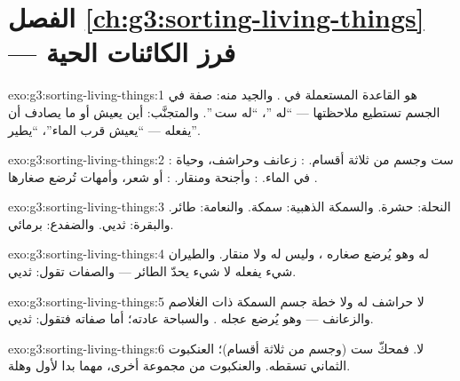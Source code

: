 \section*{الفصل \ref{ch:g3:sorting-living-things} --- فرز الكائنات الحية}

\begin{solution}{exo:g3:sorting-living-things:1}
 هو القاعدة المستعملة في . والجيد منه: صفة في الجسم
تستطيع ملاحظتها --- ``له ''، ``له ست ''. والمتجنَّب: أين
يعيش أو ما يصادف أن يفعله --- ``يعيش قرب الماء''، ``يطير''.
\end{solution}

\begin{solution}{exo:g3:sorting-living-things:2}
: ست  وجسم من ثلاثة أقسام. : زعانف وحراشف،
وحياة في الماء. :  وأجنحة ومنقار. :  أو
شعر، وأمهات تُرضع صغارها .
\end{solution}

\begin{solution}{exo:g3:sorting-living-things:3}
النحلة: حشرة. والسمكة الذهبية: سمكة. والنعامة: طائر. والبقرة:
ثديي. والضفدع: برمائي.
\end{solution}

\begin{solution}{exo:g3:sorting-living-things:4}
له  وهو يُرضع صغاره ، وليس له  ولا منقار. والطيران شيء
يفعله لا شيء يحدّ الطائر --- والصفات تقول: ثديي.
\end{solution}

\begin{solution}{exo:g3:sorting-living-things:5}
لا حراشف له ولا خطة جسم السمكة ذات الغلاصم والزعانف --- وهو يُرضع
عجله . والسباحة عادته؛ أما صفاته فتقول: ثديي.
\end{solution}

\begin{solution}{exo:g3:sorting-living-things:6}
لا. فمحكّ  ست  (وجسم من ثلاثة أقسام)؛  العنكبوت
الثماني تسقطه. والعنكبوت من مجموعة أخرى، مهما بدا لأول وهلة.
\end{solution}

